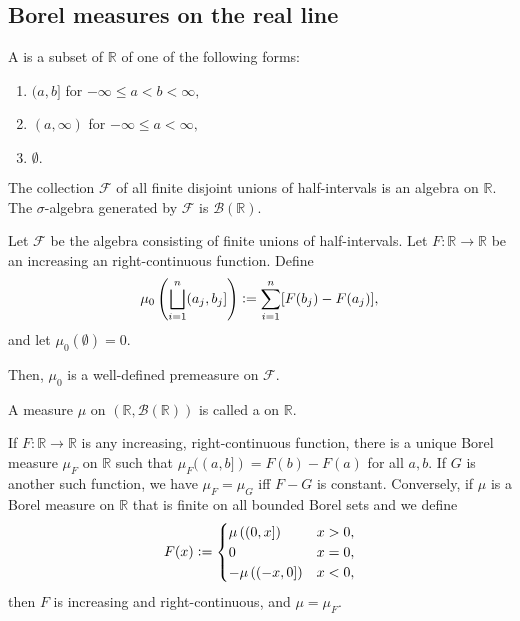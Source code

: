 \documentclass[12pt]{article}	%
\begin{document}
\subsection{Borel measures on the real line}

\begin{defn}
	A  is a subset of $\mathbb{R}$ of one of the following forms:
	\begin{enumerate}
		\item $(a, b]$ for $-\infty \le a < b < \infty,$ 
		\item $(a, \infty)$ for $-\infty \le a < \infty,$
		\item $\emptyset.$
	\end{enumerate}
\end{defn}

\begin{prop}
	The collection $\mathcal{F}$ of all finite disjoint unions of half-intervals is an algebra on $\mathbb{R}$. The $\sigma$-algebra generated by $\mathcal{F}$ is $\mathcal{B}(\mathbb{R})$.
\end{prop}

\begin{prop} 
	Let $\mathcal{F}$ be the algebra consisting of finite unions of half-intervals. Let $F : \mathbb{R} \to \mathbb{R}$ be an increasing an right-continuous function. Define
	\begin{equation*} 
		\mu_0\left(\bigsqcup_{i = 1}^n (a_j, b_j]\right) \vcentcolon= \sum_{i = 1}^{n} [F(b_j) - F(a_j)],
	\end{equation*}
	and let $\mu_0(\emptyset) = 0.$
	
	Then, $\mu_0$ is a well-defined premeasure on $\mathcal{F}.$
\end{prop}

\begin{defn}
	A measure $\mu$ on $(\mathbb{R}, \mathcal{B}(\mathbb{R}))$ is called a  on $\mathbb{R}.$
\end{defn}

\begin{thm}
	If $F : \mathbb{R} \to \mathbb{R}$ is any increasing, right-continuous function, there is a unique Borel measure $\mu_F$ on $\mathbb{R}$ such that $\mu_F((a, b]) = F(b) - F(a)$ for all $a, b.$ If $G$ is another such function, we have $\mu_F = \mu_G$ iff $F - G$ is constant. Conversely, if $\mu$ is a Borel measure on $\mathbb{R}$ that is finite on all bounded Borel sets and we define
	\begin{equation*} 
		F(x) \vcentcolon= \begin{cases}
			\mu\left((0, x]\right) & x > 0,\\
			0 & x = 0,\\
			-\mu\left((-x, 0]\right) & x < 0,
		\end{cases}
	\end{equation*}
	then $F$ is increasing and right-continuous, and $\mu = \mu_F.$
\end{thm}
\end{document}

